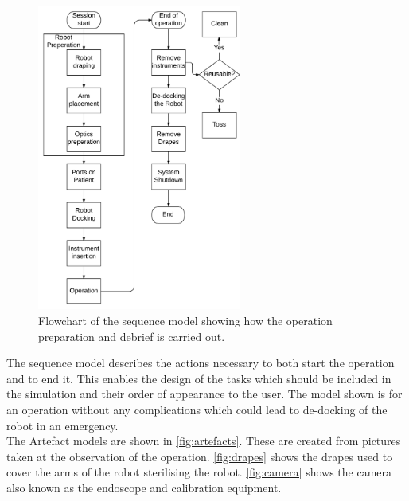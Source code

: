 \documentclass[paper=a4, fontsize=11pt]{scrartcl} %
\numberwithin{equation}{section} %
\numberwithin{figure}{section} %
\numberwithin{table}{section} %
\begin{document}
\begin{figure}[hbpt]
	\centering
	\includegraphics[width=0.6\textwidth]{sequencemodel}
	\caption{Flowchart of the sequence model showing how the operation preparation and debrief is carried out.}
	\label{fig:sequence}
\end{figure}

The sequence model describes the actions necessary to both start the operation and to end it. This enables the design of the tasks which should be included in the simulation and their order of appearance to the user.
The model shown is for an operation without any complications which could lead to de-docking of the robot in an emergency.\\


The Artefact models are shown in \autoref{fig:artefacts}. These are created from pictures taken at the observation of the operation. \autoref{fig:drapes} shows the drapes used to cover the arms of the robot sterilising the robot. \autoref{fig:camera} shows the camera also known as the endoscope and calibration equipment.
\end{document}
